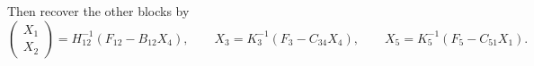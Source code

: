 \documentclass[11pt,a4paper]{article}
\newif\ifcurrentchanges
\newenvironment{currentchange}{\begingroup\ifcurrentchanges\color{red}\fi}{\endgroup}
\newcommand{\chg}[1]{{\ifcurrentchanges\color{red}\fi#1}}
\newtheorem{proposition}[proposition]{Proposition}
\theoremstyle{definition}
\numberwithin{equation}{section}
\begin{document}
Then recover the other blocks by
\begin{equation}\label{eq:schur-recovery}
 \begin{pmatrix}X_1\\ X_2\end{pmatrix}=H_{12}^{-1}(F_{12}-B_{12}X_4),\qquad
 X_3=K_3^{-1}(F_3-C_{34}X_4),\qquad
 X_5=K_5^{-1}(F_5-C_{51}X_1).
\end{equation}
%
\end{document}
